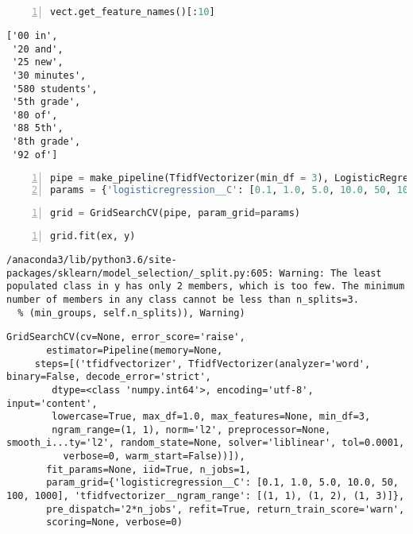 \documentclass[10pt,parskip=half,
	toc=sectionentrywithdots,
	bibliography=totocnumbered,
	captions=tableheading,numbers=noendperiod]{scrartcl}
\begin{document}
\begin{lstlisting}[language=Python,numbers=left,xleftmargin=20pt,xrightmargin=5pt,belowskip=5pt,aboveskip=5pt]
vect.get_feature_names()[:10]
\end{lstlisting}

\begin{lstlisting}[language={},postbreak={},numbers=none,xrightmargin=7pt,breakindent=0pt,aboveskip=5pt,belowskip=5pt]
['00 in',
 '20 and',
 '25 new',
 '30 minutes',
 '580 students',
 '5th grade',
 '80 of',
 '88 5th',
 '8th grade',
 '92 of']
\end{lstlisting}

\begin{lstlisting}[language=Python,numbers=left,xleftmargin=20pt,xrightmargin=5pt,belowskip=5pt,aboveskip=5pt]
pipe = make_pipeline(TfidfVectorizer(min_df = 3), LogisticRegression())
params = {'logisticregression__C': [0.1, 1.0, 5.0, 10.0, 50, 100, 1000], 'tfidfvectorizer__ngram_range': [(1,1), (1,2), (1,3)]}
\end{lstlisting}

\begin{lstlisting}[language=Python,numbers=left,xleftmargin=20pt,xrightmargin=5pt,belowskip=5pt,aboveskip=5pt]
grid = GridSearchCV(pipe, param_grid=params)
\end{lstlisting}

\begin{lstlisting}[language=Python,numbers=left,xleftmargin=20pt,xrightmargin=5pt,belowskip=5pt,aboveskip=5pt]
grid.fit(ex, y)
\end{lstlisting}

\begin{lstlisting}[language={},postbreak={},numbers=none,xrightmargin=7pt,belowskip=5pt,aboveskip=5pt,breakindent=0pt]
/anaconda3/lib/python3.6/site-packages/sklearn/model_selection/_split.py:605: Warning: The least populated class in y has only 2 members, which is too few. The minimum number of members in any class cannot be less than n_splits=3.
  % (min_groups, self.n_splits)), Warning)

\end{lstlisting}

\begin{lstlisting}[language={},postbreak={},numbers=none,xrightmargin=7pt,breakindent=0pt,aboveskip=5pt,belowskip=5pt]
GridSearchCV(cv=None, error_score='raise',
       estimator=Pipeline(memory=None,
     steps=[('tfidfvectorizer', TfidfVectorizer(analyzer='word', binary=False, decode_error='strict',
        dtype=<class 'numpy.int64'>, encoding='utf-8', input='content',
        lowercase=True, max_df=1.0, max_features=None, min_df=3,
        ngram_range=(1, 1), norm='l2', preprocessor=None, smooth_i...ty='l2', random_state=None, solver='liblinear', tol=0.0001,
          verbose=0, warm_start=False))]),
       fit_params=None, iid=True, n_jobs=1,
       param_grid={'logisticregression__C': [0.1, 1.0, 5.0, 10.0, 50, 100, 1000], 'tfidfvectorizer__ngram_range': [(1, 1), (1, 2), (1, 3)]},
       pre_dispatch='2*n_jobs', refit=True, return_train_score='warn',
       scoring=None, verbose=0)
\end{lstlisting}
\end{document}
